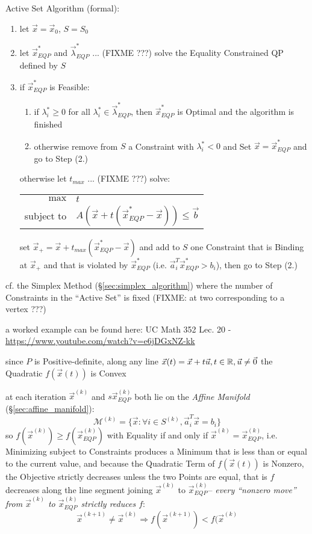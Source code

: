 Active Set Algorithm (formal):
\begin{enumerate}
  \item let $\vec{x} = \vec{x}_0$, $S = S_0$
  \item let $\vec{x}^*_{EQP}$ and $\vec{\lambda}^*_{EQP}$ ... (FIXME ???) solve
    the Equality Constrained QP defined by $S$
  \item if $\vec{x}^*_{EQP}$ is Feasible:
    \begin{enumerate}
      \item if $\lambda^*_i \geq 0$ for all $\lambda^*_i \in
        \vec{\lambda}^*_{EQP}$, then $\vec{x}^*_{EQP}$ is Optimal and the
        algorithm is finished
      \item otherwise remove from $S$ a Constraint with $\lambda^*_i < 0$ and
        Set $\vec{x} = \vec{x}^*_{EQP}$ and go to Step (2.)
    \end{enumerate}
    otherwise let $t_{max}$ ... (FIXME ???) solve:

    \begin{tabular}{r l}
      $\mathrm{max}$ & $t$ \\
      subject to     & $A(\vec{x} + t(\vec{x}^*_{EQP} - \vec{x})) \leq \vec{b}$
    \end{tabular}

    set $\vec{x}_+ = \vec{x} + t_{max}(\vec{x}^*_{EQP} - \vec{x})$ and add to
    $S$ one Constraint that is Binding at $\vec{x}_+$ and that is violated by
    $\vec{x}^*_{EQP}$ (i.e. $\vec{a}_i^T\vec{x}^*_{EQP} > b_i$), then go to
    Step (2.)
\end{enumerate}

cf. the Simplex Method (\S\ref{sec:simplex_algorithm}) where the number of
Constraints in the ``Active Set'' is fixed (FIXME: at two corresponding to a
vertex ???)

a worked example can be found here: UC Math 352 Lec. 20 -
\url{https://www.youtube.com/watch?v=e6jDGxNZ-kk}

since $P$ is Positive-definite, along any line $\vec{x}(t) = \vec{x} +
t\vec{u}, t \in \mathbb{R}, \vec{u} \neq \vec{0}$ the Quadratic $f(\vec{x}(t))$ is
Convex

at each iteration $\vec{x}^{(k)}$ and $s\vec{x}_{EQP}^{(k)}$ both lie on the
\emph{Affine Manifold} (\S\ref{sec:affine_manifold}):
\[
  \mathcal{M}^(k) = \{
    \vec{x} : \forall i \in S^{(k)}, \vec{a}_i^T\vec{x} = b_i
  \}
\]
so $f(\vec{x}^{(k)}) \geq f(\vec{x}_{EQP}^{(k)})$ with Equality if and only if
$\vec{x}^{(k)} = \vec{x}_{EQP}^{(k)}$, i.e. Minimizing subject to Constraints
produces a Minimum that is less than or equal to the current value, and because
the Quadratic Term of $f(\vec{x}(t))$ is Nonzero, the Objective strictly
decreases unless the two Points are equal, that is $f$ decreases along the line
segment joining $\vec{x}^{(k)}$ to $\vec{x}_{EQP}^{(k)}$-- \emph{every ``nonzero
  move'' from $\vec{x}^{(k)}$ to $\vec{x}_{EQP}^{(k)}$ strictly reduces $f$}:
\[
  \vec{x}^{(k+1)} \neq \vec{x}^{(k)} \Rightarrow
    f(\vec{x}^{(k+1)}) < f(\vec{x}^{(k)}
\]

